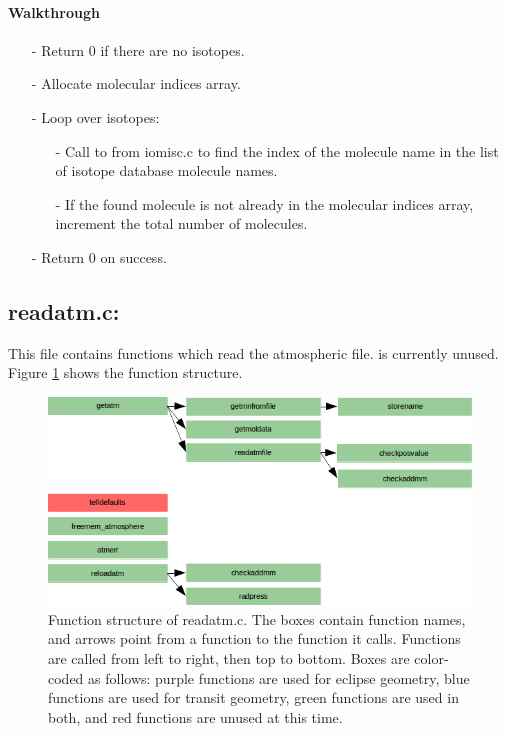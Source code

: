 \documentclass[letterpaper,12pt]{article}
\begin{document}
\paragraph{Walkthrough}
\begin{enumerate}[leftmargin=10pt, noitemsep, parsep=0pt, topsep=0ex]
\item[-] Return 0 if there are no isotopes.
\item[-] Allocate molecular indices array.
\item[-] Loop over isotopes:
\begin{enumerate}[leftmargin=10pt, noitemsep, parsep=0pt, topsep=0ex]
\item[-] Call to  from iomisc.c to find the index of the molecule name in the list of isotope database molecule names.
\item[-] If the found molecule is not already in the molecular indices array, increment the total number of molecules.
\end{enumerate}
\item[-] Return 0 on success.
\end{enumerate}

\newpage
\subsection{readatm.c:}
This file contains functions which read the atmospheric file.  is currently unused. Figure \ref{fig:readatmc} shows the function structure.

\begin{figure}
\includegraphics{fig/readatmc}
\caption{Function structure of readatm.c. The boxes contain function names, and arrows point from a function to the function it calls. Functions are called from left to right, then top to bottom.  Boxes are color-coded as follows:  purple functions are used for eclipse geometry, blue functions are used for transit geometry, green functions are used in both, and red functions are unused at this time.}
\label{fig:readatmc}
\end{figure}
\end{document}
